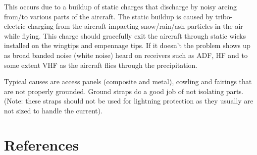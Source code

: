 \documentclass[
]{book}
\begin{document}
This occurs due to a buildup of static charges that discharge by noisy arcing
from/to various parts of the aircraft. The static buildup is caused by
tribo-electric charging from the aircraft impacting snow/rain/ash particles in
the air while flying. This charge should gracefully exit the aircraft through
static wicks installed on the wingtips and empennage tips. If it doesn't the
problem shows up as broad banded noise (white noise) heard on receivers such as
ADF, HF and to some extent VHF as the aircraft flies through the precipitation.

Typical causes are access panels (composite and metal), cowling and fairings
that are not properly grounded. Ground straps do a good job of not isolating
parts. (Note: these straps should not be used for lightning protection as they
usually are not sized to handle the current).

\hypertarget{references}{%
\section{References}\label{references}}
\end{document}
